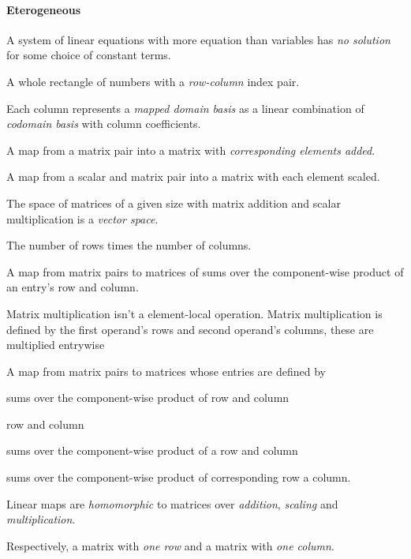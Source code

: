 \begin{multicols}{3}
  \paragraph{\textbf{Eterogeneous}}
  A system of linear equations with more equation than variables has \textit{no solution} for some choice of constant terms.
  
  A whole rectangle of numbers with a \textit{row-column} index pair.
  
  Each column represents a \textit{mapped domain basis} as a linear combination of \textit{codomain basis} with column coefficients.

  A map from a matrix pair into a matrix with \textit{corresponding elements added}.

  A map from a scalar and matrix pair into a matrix with each element scaled.
  
  The space of matrices of a given size with matrix addition and scalar multiplication is a \textit{vector space}.
  
  The number of rows times the number of columns.

  A map from matrix pairs to matrices of sums over the component-wise product of an entry's row and column.


  Matrix multiplication isn't a element-local operation.
  Matrix multiplication is defined by the first operand's rows and second operand's columns,
  these are multiplied entrywise

  A map from matrix pairs to matrices whose entries are defined by


  sums over the component-wise product of row and column

  row and column

  sums over the component-wise product of a row and column

  sums over
  the component-wise product of
  corresponding row a column.
  

  
  Linear maps are \textit{homomorphic} to matrices over \textit{addition}, \textit{scaling} and \textit{multiplication}.

  Respectively, a matrix with \textit{one row} and a matrix with \textit{one column}.


\end{multicols}
